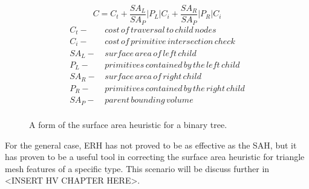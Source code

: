 \begin{figure}[H]
  \begin{equation}
    C =  C_{t} + \frac{SA_{L}}{SA_{P}} |P_{L}|C_{i} +  \frac{SA_{R}}{SA_{P}} |P_{R}|C_{i}
    \label{eq:SAH}
  \end{equation}
  \begin{align*}
    C_{t} - & \,cost\, of\, traversal\, to\, child\, nodes \\
    C_{i} - & \, cost\, of\, primitive\, intersection\, check\, \\
    SA_{L} - &  \,surface\, area\, of\, left\, child \\
    P_{L} - & \, primitives\, contained\, by\, the\, left\, child  \\
    SA_{R} - & \, surface\, area\, of\, right\, child \\
    P_{R} - & \, primitives\, contained\, by\, the\, right\, child \\
    SA_{P} - & \, parent\, bounding\, volume \\
  \end{align*}
  \caption{A form of the surface area heuristic for a binary tree.}
  \label{fig:SAH}
\end{figure}

For the general case, ERH has not proved to be as effective as the SAH, but it
has proven to be a useful tool in correcting the surface area heuristic for
triangle mesh features of a specific type. This scenario will be discuss further
in <INSERT HV CHAPTER HERE>.
